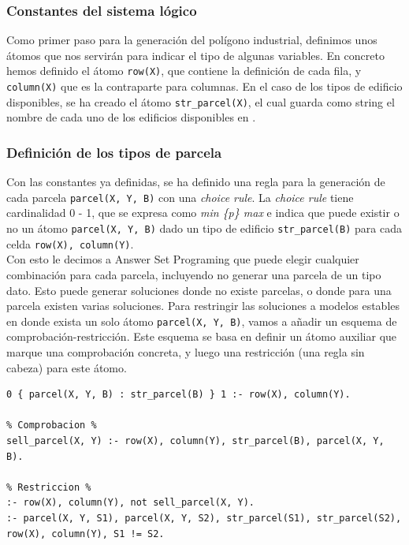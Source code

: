 \subsubsection{Constantes del sistema lógico}

Como primer paso para la generación del polígono industrial, definimos unos átomos que nos servirán para indicar el tipo de algunas variables. En concreto hemos definido el átomo \texttt{row(X)}, que contiene la definición de cada fila, y \texttt{column(X)} que es la contraparte para columnas. En el caso de los tipos de edificio disponibles, se ha creado el átomo \texttt{str\_parcel(X)}, el cual guarda como string el nombre de cada uno de los edificios disponibles en \cities.

\subsubsection{Definición de los tipos de parcela}

Con las constantes ya definidas, se ha definido una regla para la generación de cada parcela \texttt{parcel(X, Y, B)} con una \textit{choice rule}. La \textit{choice rule} tiene cardinalidad 0 - 1, que se expresa como \textit{min \{p\} max} e indica que puede existir o no un átomo \texttt{parcel(X, Y, B)} dado un tipo de edificio \texttt{str\_parcel(B)} para cada celda \texttt{row(X), column(Y)}. \\

Con esto le decimos a Answer Set Programing que puede elegir cualquier combinación para cada parcela, incluyendo no generar una parcela de un tipo dato. Esto puede generar soluciones donde no existe parcelas, o donde para una parcela existen varias soluciones. Para restringir las soluciones a modelos estables en donde exista un solo átomo \texttt{parcel(X, Y, B)}, vamos a añadir un esquema de comprobación-restricción. Este esquema se basa en definir un átomo auxiliar que marque una comprobación concreta, y luego una restricción (una regla sin cabeza) para este átomo.

\begin{lstlisting}[caption={Código para la generación de parcelas},captionpos=b,label=lst:parcel_def]
% Generacion %
0 { parcel(X, Y, B) : str_parcel(B) } 1 :- row(X), column(Y).

% Comprobacion %
sell_parcel(X, Y) :- row(X), column(Y), str_parcel(B), parcel(X, Y, B).

% Restriccion %
:- row(X), column(Y), not sell_parcel(X, Y).
:- parcel(X, Y, S1), parcel(X, Y, S2), str_parcel(S1), str_parcel(S2), row(X), column(Y), S1 != S2.
\end{lstlisting}

